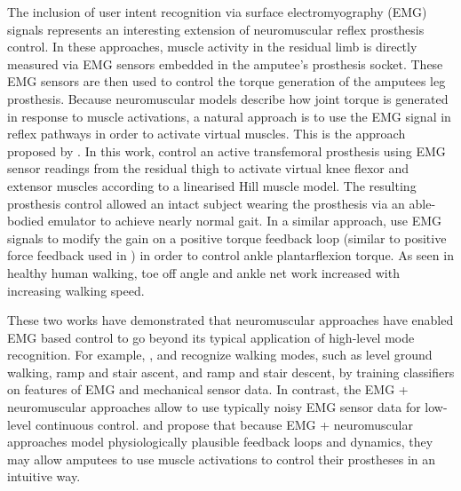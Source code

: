 The inclusion of user intent recognition via surface electromyography (EMG)
signals represents an interesting extension of neuromuscular reflex prosthesis
control. In these approaches, muscle activity in the residual limb is directly
measured via EMG sensors embedded in the amputee's prosthesis socket. These EMG
sensors are then used to control the torque generation of the amputees leg
prosthesis. Because neuromuscular models describe how joint torque is generated
in response to muscle activations, a natural approach is to use the EMG signal
in reflex pathways in order to activate virtual muscles. This is the approach
proposed by \citet{wu2011electromyography}. In this work,
\citeauthor{wu2011electromyography} control an active transfemoral prosthesis
using EMG sensor readings from the residual thigh to activate virtual knee
flexor and extensor muscles according to a linearised Hill muscle model. The
resulting prosthesis control allowed an intact subject wearing the prosthesis
via an able-bodied emulator to achieve nearly normal gait. In a similar
approach, \citet{wang2013proportional} use EMG signals to modify the gain on a
positive torque feedback loop (similar to positive force feedback used in
\citet{geyer2010muscle}) in order to control ankle plantarflexion torque. As
seen in healthy human walking, toe off angle and ankle net work increased with
increasing walking speed.

These two works have demonstrated that neuromuscular approaches have enabled EMG
based control to go beyond its typical application of high-level mode
recognition. For example, \citet{huang2009strategy, huang2011continuous}, and
\citet{hargrove2015intuitive} recognize walking modes, such as level ground
walking, ramp and stair ascent, and ramp and stair descent, by training
classifiers on features of EMG and mechanical sensor data. In contrast, the EMG
+ neuromuscular approaches allow to use typically noisy EMG sensor data for
low-level continuous control. \citet{wu2011electromyography} and
\citet{wang2013proportional} propose that because EMG + neuromuscular approaches
model physiologically plausible feedback loops and dynamics, they may allow
amputees to use muscle activations to control their prostheses in an intuitive
way.

